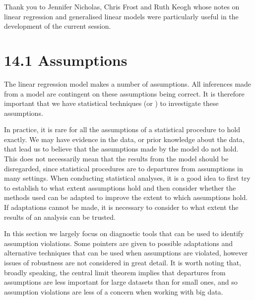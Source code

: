 \documentclass[letterpaper,10pt,english]{jupyterBook}
\begin{document}
\sphinxAtStartPar
{} Thank you to Jennifer Nicholas, Chris Frost and Ruth Keogh whose notes on linear regression and generalised linear models were particularly useful in the development of the current session.


\section{14.1 Assumptions}
\label{\detokenize{14.b. Linear Regression III:assumptions}}\label{\detokenize{14.b. Linear Regression III::doc}}
\sphinxAtStartPar
The linear regression model makes a number of assumptions. All inferences made from a model are contingent on these assumptions being correct. It is therefore important that we have statistical techniques (or ) to investigate these assumptions.

\sphinxAtStartPar
In practice, it is rare for all the assumptions of a statistical procedure to hold exactly. We may have evidence in the data, or prior knowledge about the data, that lead us to believe that the assumptions made by the model do not hold. This does not necessarily mean that the results from the model should be disregarded, since statistical procedures are  to departures from assumptions in many settings. When conducting statistical analyses, it is a good idea to first try to establish to what extent assumptions hold and then consider whether the methods used can be adapted to improve the extent to which assumptions hold. If adaptations cannot be made, it is necessary to consider to what extent the results of an analysis can be trusted.

\sphinxAtStartPar
In this section we largely focus on diagnostic tools that can be used to identify assumption violations. Some pointers are given to possible adaptations and alternative techniques that can be used when assumptions are violated, however issues of robustness are not considered in great detail. It is worth noting that, broadly speaking, the central limit theorem implies that departures from assumptions are less important for large datasets than for small ones, and so assumption violations are less of a concern when working with big data.
\end{document}
